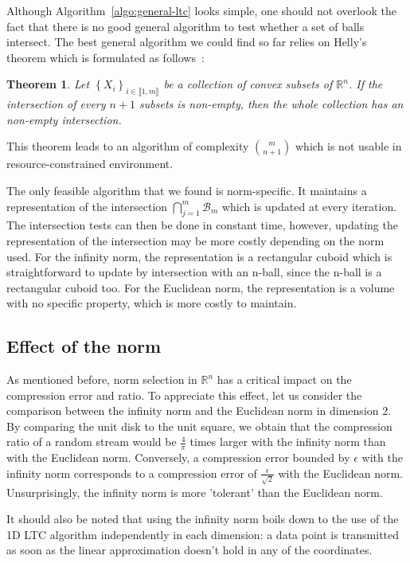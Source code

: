 \documentclass[10pt, conference, compsocconf]{IEEEtran}
\newcommand{\todo}[1]{\marginpar{\parbox{18mm}{\flushleft\tiny\color{red}\textbf{TODO}:
      #1}}}
\newtheorem*{theorem}{Theorem}
\begin{document}
Although Algorithm~\ref{algo:general-ltc} looks simple, one should not 
overlook the fact that there is no good general algorithm to test 
whether a set of balls intersect. The best general algorithm we could find 
so far relies on Helly's theorem which is formulated as follows~\cite{helly1923mengen}:
\begin{theorem}
Let $\left\{ X_i \right\}_{i \in \llbracket 1, m \rrbracket}$ be a collection of convex subsets of $\mathbb{R}^n$. If the intersection of every $n+1$ 
subsets is non-empty, then the whole collection has an non-empty intersection.
\end{theorem}
This theorem leads to an algorithm of complexity ${m \choose n+1}$ which is 
not usable in resource-constrained environment. 

The only feasible algorithm that we found is norm-specific. It 
maintains a representation of the intersection 
$\bigcap_{j=1}^{m}{\mathcal{B}_m}$ which is updated at every iteration.
The intersection tests can then be done in constant time, however, 
updating the representation of the intersection may be more costly 
depending on the norm used. For the infinity norm, the representation 
is a rectangular cuboid which is straightforward to update by 
intersection with an n-ball, since the n-ball is a rectangular cuboid too.
For the Euclidean norm, the representation is a volume with no specific property,
which is more costly to maintain.

\subsection{Effect of the norm}

As mentioned before, norm selection in $\mathbb{R}^n$ has a critical 
impact on the compression error and ratio. To appreciate this effect, 
let us consider the comparison between the infinity norm and the 
Euclidean norm in dimension 2. By comparing the unit disk to the unit 
square, we obtain that the compression ratio of a random stream would 
be $\frac{4}{\pi}$ times larger with the infinity norm than with the 
Euclidean norm. Conversely, a compression error bounded by $\epsilon$ 
with the infinity norm corresponds to a compression error of 
$\frac{\epsilon}{\sqrt{2}}$ with the Euclidean norm. Unsurprisingly, the
infinity norm is more 'tolerant' than the Euclidean norm.

\todo{Perhaps add a figure}

It should also be noted that using the infinity norm boils down to the 
use of the 1D LTC algorithm independently in each dimension: a data 
point is transmitted as soon as the linear approximation doesn't hold 
in any of the coordinates. \todo{This is unclear}
\end{document}
